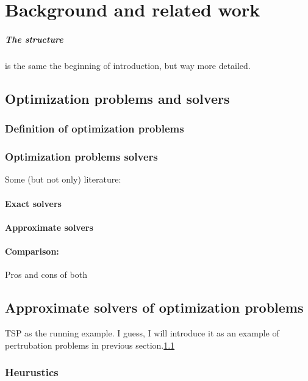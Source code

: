 \chapter{Background and related work}\label{chap:background}
\paragraph{The structure} is the same the beginning of introduction, but way more detailed.  


\section{Optimization problems and solvers}\label{sec:opt problms, solvrs}

\subsection{Definition of optimization problems}

\subsection{Optimization problems solvers} 
Some (but not only) literature: \cite{bergstra2011algorithms}
\subsubsection{Exact solvers}
\subsubsection{Approximate solvers} 
\subsubsection{Comparison:} Pros and cons of both \cite{hromkovivc2013algorithmics}


\section{Approximate solvers of optimization problems}
TSP as the running example. I guess, I will introduce it as an example of pertrubation problems in previous section.\ref{sec:opt problms, solvrs}

\subsection{Heurustics}
